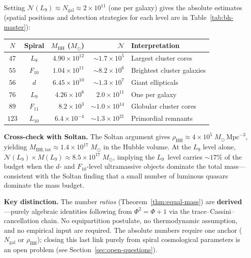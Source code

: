 \documentclass[12pt,a4paper]{article}
\begin{document}
\noindent Setting $\mathcal{N}(L_9) \approx N_{\mathrm{gal}} \approx 2 \times 10^{11}$ (one per galaxy) gives the absolute estimates (spatial positions and detection strategies for each level are in Table~\ref{tab:bh-master}):

\begin{center}\small
\begin{tabular}{c|c|r|r|l}
$N$ & Spiral & $M_{\mathrm{BH}}$ ($M_\odot$) & $\mathcal{N}$ & Interpretation \\
\hline
$47$ & $L_8$ & $4.90 \times 10^{12}$ & $\sim 1.7 \times 10^{5}$ & Largest cluster cores \\
$55$ & $F_{10}$ & $1.04 \times 10^{11}$ & $\sim 8.2 \times 10^{6}$ & Brightest cluster galaxies \\
$56$ & $d$ & $6.45 \times 10^{10}$ & $\sim 1.3 \times 10^{7}$ & Giant ellipticals \\
$76$ & $L_9$ & $4.26 \times 10^{6}$ & $2.0 \times 10^{11}$ & One per galaxy \\
$89$ & $F_{11}$ & $8.2 \times 10^{3}$ & $\sim 1.0 \times 10^{14}$ & Globular cluster cores \\
$123$ & $L_{10}$ & $6.4 \times 10^{-4}$ & $\sim 1.3 \times 10^{21}$ & Primordial remnants \\
\end{tabular}
\end{center}

\noindent\textbf{Cross-check with Soltan.}\; The Soltan argument gives $\rho_{\mathrm{BH}} \approx 4 \times 10^5\;M_\odot\,\mathrm{Mpc}^{-3}$, yielding $M_{\mathrm{BH,tot}} \approx 1.4 \times 10^{17}\;M_\odot$ in the Hubble volume.  At the $L_9$ level alone, $\mathcal{N}(L_9) \times M(L_9) \approx 8.5 \times 10^{17}\;M_\odot$, implying the $L_9$~level carries $\sim 17\%$ of the budget when the $d$- and $F_{10}$-level ultramassive objects dominate the total mass---consistent with the Soltan finding that a small number of luminous quasars dominate the mass budget.

\medskip

\noindent\textbf{Key distinction.}\; The number \emph{ratios} (Theorem~\ref{thm:equal-mass}) are \textbf{derived}---purely algebraic identities following from $\Phi^2=\Phi+1$ via the trace--Cassini--cancellation chain.  No equipartition postulate, no thermodynamic assumption, and no empirical input are required.  The absolute numbers require one anchor ($N_{\mathrm{gal}}$ or $\rho_{\mathrm{BH}}$); closing this last link purely from spiral cosmological parameters is an open problem (see Section~\ref{sec:open-questions}).
\end{document}
